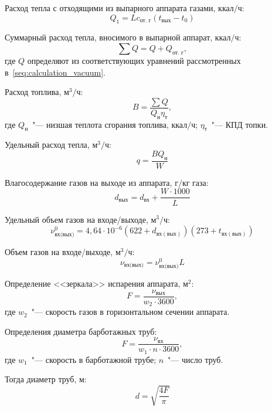 Расход тепла с отходящими из выпарного аппарата газами, \(\text{ккал}/\text{ч}\):
\begin{equation}
 {Q}_{1}=L{c}_{\text{от. г}}\left({t}_{\text{вых}}-{t}_{0}\right) 
\end{equation}

Суммарный расход тепла, вносимого в выпарной аппарат, \(\text{ккал}/\text{ч}\):
\begin{equation}
 \sum Q=Q+{Q}_{\text{от. г}},
\end{equation}
где \(Q\) определяют из соответствующих уравнений рассмотренных в~\cref{seq:calculation_vacuum}.

Расход топлива, \(\text{м}^{3}/\text{ч}\):
\begin{equation}
 B=\frac{\sum Q}{{Q}_{\text{н}}{\eta }_{т}},
\end{equation}
где \({Q}_{\text{н}}\)~"--- низшая теплота сгорания топлива, \(\text{ккал}/\text{ч}\); \({\eta }_{т}\)~"--- КПД топки.

Удельный расход тепла, \(\text{м}^{3}/\text{ч}\):
\begin{equation}
 q=\frac{B{Q}_{\text{н}}}{W} 
\end{equation}

Влагосодержание газов на выходе из аппарата, \(\text{г}/\text{кг газа}\):
\begin{equation}
 {d}_{\text{вых}}={d}_{\text{вх}}+\frac{W\cdot 1000}{L} 
\end{equation}

Удельный объем газов на входе/выходе, \(\text{м}^{3}/\text{ч}\):
\begin{equation}
{\nu }_{\text{вх(вых)}}^{0}=4,64\cdot {10}^{-6}\left(622+{d}_{вх(вых)}\right)\left(273+{t}_{вх(вых)}\right)
\end{equation}

Объем газов на входе/выходе,  \(\text{м}^{3}/\text{ч}\):
\begin{equation}
 {\nu }_{\text{вх(вых)}}={\nu }_{\text{вх(вых)}}^{0}L 
\end{equation}

Определение <<зеркала>> испарения аппарата, \(\text{м}^{2}\):
\begin{equation}
 F=\frac{{\nu}_{\text{вых}}}{{w}_{2}\cdot 3600},
\end{equation}
где \(w_{2}\)~"--- скорость газов в горизонтальном сечении аппарата.

Определения диаметра барботажных труб:
\begin{equation}
 F=\frac{{\nu}_{\text{вх}}}{{w}_{1}\cdot n \cdot 3600},
\end{equation}
где \(w_{1}\)~"--- скорость в барботажной трубе; \(n\)~"--- число труб.

Тогда диаметр труб, \(\text{м}\):
\begin{equation}
 d=\sqrt{\frac{4F}{\pi }} 
\end{equation}
